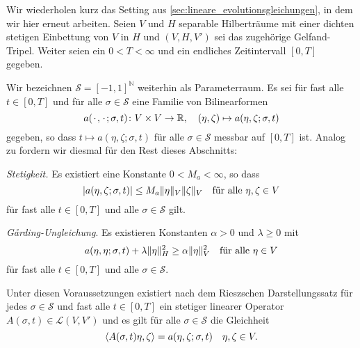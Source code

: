 Wir wiederholen kurz das Setting aus \autoref{sec:lineare_evolutionsgleichungen}, in dem wir hier erneut arbeiten.
Seien $V$ und $H$ separable Hilberträume mit einer dichten stetigen Einbettung von $V$ in $H$ und $(V, H, V')$ sei das zugehörige Gelfand-Tripel.
Weiter seien ein $0 < T < \infty$ und ein endliches Zeitintervall $[0, T]$ gegeben.

Wir bezeichnen $\mathcal S = [-1, 1]^{\mathbb{N}}$ weiterhin als Parameterraum.
Es sei für fast alle $t \in [0, T]$ und für alle $\sigma \in \mathcal S$ eine Familie von Bilinearformen
\begin{equation}
    a({\mkern2mu\cdot\mkern2mu}, {\mkern2mu\cdot\mkern2mu}; \sigma, t) \colon V \times V \to \mathbb{R}, \quad (\eta, \zeta) \mapsto a(\eta, \zeta; \sigma, t)
\end{equation}
gegeben, so dass $t \mapsto a(\eta, \zeta; \sigma, t)$ für alle $\sigma \in \mathcal S$ messbar auf $[0, T]$ ist.
Analog zu  fordern wir diesmal für den Rest dieses Abschnitts:
\begin{Annahme}
\label{annahme:pp:eigenschaften_bf_a}
    \leavevmode
    \begin{thmenumerate}
        \item \emph{Stetigkeit.}
        Es existiert eine Konstante $0 < M_{a} < \infty$, so dass
        \begin{equation}
            \label{eq:allgemeine_parabolische_pde:bf_stetig}
            \abs{a(\eta, \zeta; \sigma, t)} \leq M_{a} \norm{\eta}_{V} \norm{\zeta}_{V} \quad \fa \eta, \zeta \in V
        \end{equation}
        für fast alle $t \in [0, T]$ und alle $\sigma \in \mathcal S$ gilt.
        \item \emph{G\r{a}rding-Ungleichung}.
        Es existieren Konstanten $\alpha > 0$ und $\lambda \geq 0$ mit
        \begin{equation}
            \label{eq:allgemeine_parabolische_pde:bf_garding}
            a(\eta, \eta; \sigma, t) + \lambda \norm{\eta}_{H}^{2} \geq \alpha \norm{\eta}_{V}^{2} \quad \fa \eta \in V
        \end{equation}
        für fast alle $t \in [0, T]$ und alle $\sigma \in \mathcal S$.
    \end{thmenumerate}
\end{Annahme}

Unter diesen Voraussetzungen existiert nach dem Rieszschen Darstellungssatz für jedes $\sigma \in \mathcal S$ und fast alle $t \in [0, T]$ ein stetiger linearer Operator $A(\sigma, t) \in \mathcal L(V, V')$ und es gilt für alle $\sigma \in \mathcal S$ die Gleichheit
\begin{equation}
    \left\langle A(\sigma, t) \eta,\zeta\right\rangle = a(\eta, \zeta; \sigma, t) \quad \eta, \zeta \in V.
\end{equation}


